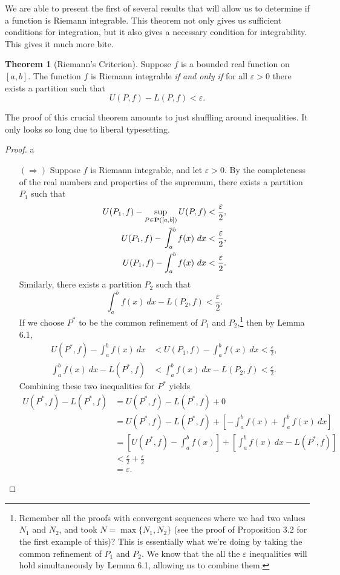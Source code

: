 \documentclass{article}
\def\upint{\mathchoice%
	{\mkern13mu\overline{\vphantom{\intop}\mkern7mu}\mkern-20mu}%
	{\mkern7mu\overline{\vphantom{\intop}\mkern7mu}\mkern-14mu}%
	{\mkern7mu\overline{\vphantom{\intop}\mkern7mu}\mkern-14mu}%
	{\mkern7mu\overline{\vphantom{\intop}\mkern7mu}\mkern-14mu}%
	\int}
\theoremstyle{definition}
\newtheorem{theorem}{Theorem}[section]
\begin{document}
We are able to present the first of several results that will allow us to determine if a function is Riemann integrable. This theorem not only gives us sufficient conditions for integration, but it also gives a necessary condition for integrability. This gives it much more bite. 
\begin{theorem}[Riemann's Criterion]
	Suppose $ f $ is a bounded real function on $ [a,b] $. The function $ f $ is Riemann integrable \textit{if and only if} for all $ \varepsilon>0 $ there exists a partition such that $$ U(P,f)-L(P,f)<\varepsilon.$$
\end{theorem} The proof of this crucial theorem amounts to just shuffling around inequalities. It only looks so long due to liberal typesetting.  
\begin{proof}{\color{white}a}
		\begin{enumerate}
		\item [$ (\Longrightarrow) $] Suppose $ f $ is Riemann integrable, and let $ \varepsilon>0 $. By the completeness of the real numbers and properties of the supremum, there exists a partition $ P_1 $ such that \begin{align*}
			U(P_1,f)-\sup\limits_{P\in\textbf{P}([a,b])}U(P,f)&<\frac{\varepsilon}{2},\\
			U(P_1,f)-\upint_a^b f(x)\ dx&<\frac{\varepsilon}{2},\\
			U(P_1,f)-\int_a^b f(x)\ dx&<\frac{\varepsilon}{2}.
		\end{align*} 
		Similarly, there exists a partition $ P_2 $ such that $$\int_a^bf(x)\ dx-L(P_2,f)<\frac{\varepsilon}{2}. $$ If we choose $ P^* $ to be the common refinement of $ P_1 $ and $ P_2 $,\footnote{Remember all the proofs with convergent sequences where we had two values $ N_1 $ and $ N_2 $, and took $ N=\max\{N_1,N_2\} $ (see the proof of Proposition 3.2 for the first example of this)? This is essentially what we're doing by taking the common refinement of $ P_1 $ and $ P_2 $. We know that the all the $ \varepsilon $ inequalities will hold simultaneously by Lemma 6.1, allowing us to combine them.} then by Lemma 6.1, \begin{align*}
U(P^*,f)-\int_a^b f(x)\ dx&<U(P_1,f)-\int_a^b f(x)\ dx<\frac{\varepsilon}{2},\\\int_a^bf(x)\ dx-L(P^*,f)&<\int_a^bf(x)\ dx-L(P_2,f)<\frac{\varepsilon}{2}.
		\end{align*}
		Combining these two inequalities for $ P^* $ yields
		\begin{align*}
U(P^*,f)-L(P^*,f)&=U(P^*,f)-L(P^*,f)+0\\&=U(P^*,f)-L(P^*,f)+\left[-\int_a^b f(x)+\int_a^bf(x)\ dx\right]\\&=\left[U(P^*,f)-\int_a^b f(x)\right]+\left[\int_a^bf(x)\ dx-L(P^*,f)\right]\\&<\frac{\varepsilon}{2}+\frac{\varepsilon}{2}\\&=\varepsilon.

\end{align*}
\end{enumerate}
\end{proof}
\end{document}
